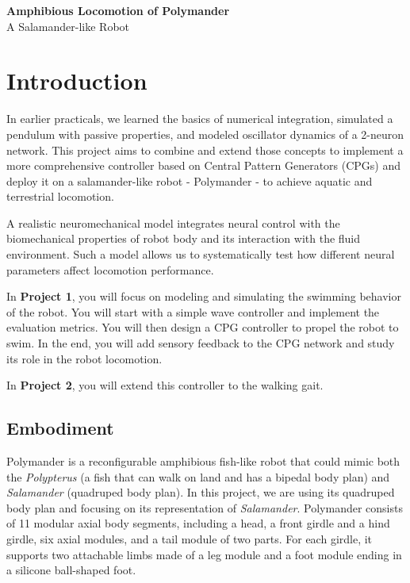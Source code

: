 \documentclass{cmc}
\begin{document}
\pagestyle{fancy}

\begin{center}
{\huge\bfseries Amphibious Locomotion of Polymander} \\[0.5em]
{\LARGE A Salamander-like Robot}
\end{center}

\tableofcontents

\section{Introduction}\label{sec:exploring-swimming}

In earlier practicals, we learned the basics of numerical integration, simulated a pendulum with passive properties, and modeled oscillator dynamics of a 2-neuron network. This project aims to combine and extend those concepts to implement a more comprehensive controller based on Central Pattern Generators (CPGs) and deploy it on a salamander-like robot - Polymander - to achieve aquatic and terrestrial locomotion.

A realistic neuromechanical model integrates neural control with
the biomechanical properties of robot body and its interaction with the fluid environment. Such a model allows us to systematically test how different neural parameters affect locomotion performance.

In \textbf{Project 1}, you will focus on modeling and simulating the swimming behavior of the robot. You will start with a simple wave controller and implement the evaluation metrics. You will then design a CPG controller to propel the robot to swim. In the end, you will add sensory feedback to the CPG network and study its role in the robot locomotion.

In \textbf{Project 2}, you will extend this controller to the walking gait.

\subsection{Embodiment}
Polymander \cite{fu2026polymander2} is a reconfigurable amphibious fish-like robot that could mimic both the \textit{Polypterus} (a fish that can walk on land and has a bipedal body plan) and \textit{Salamander} (quadruped body plan). In this project, we are using its quadruped body plan and focusing on its representation of \textit{Salamander}. Polymander consists of 11 modular axial body segments, including a head, a front girdle and a hind girdle, six axial modules, and a tail module of two parts. For each girdle, it supports two attachable limbs made  of a leg module and a foot module ending in a silicone ball-shaped foot.
\end{document}
